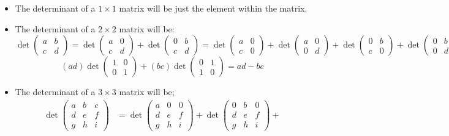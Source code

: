 \documentclass[12pt]{amsart}
\begin{document}
\begin{itemize}
	\item The determinant of a $1 \times 1$ matrix will be just the element within the matrix.
	\item The determinant of a $2 \times 2$ matrix will be:
	\[\det \begin{pmatrix}a&b\\c&d\end{pmatrix} = 
	  \det \begin{pmatrix}a&0\\c&d\end{pmatrix} + \det \begin{pmatrix}0&b\\c&d\end{pmatrix} = 
	  \det \begin{pmatrix}a&0\\c&0\end{pmatrix} + \det \begin{pmatrix}a&0\\0&d\end{pmatrix} + 
	  \det \begin{pmatrix}0&b\\c&0\end{pmatrix} + \det \begin{pmatrix}0&b\\0&d\end{pmatrix} = \]
	  \[(ad)\det \begin{pmatrix}1&0\\0&1\end{pmatrix} + (bc)\det \begin{pmatrix}0&1\\1&0\end{pmatrix} =
	  ad - bc\]
	\item The determinant of a $3 \times 3$ matrix will be;
	\begin{align*}
		\det \begin{pmatrix}a&b&c\\d&e&f\\g&h&i\end{pmatrix} &=
		\det \begin{pmatrix}a&0&0\\d&e&f\\g&h&i\end{pmatrix} + 
		\det \begin{pmatrix}0&b&0\\d&e&f\\g&h&i\end{pmatrix} + 

\end{align*}
\end{itemize}
\end{document}
